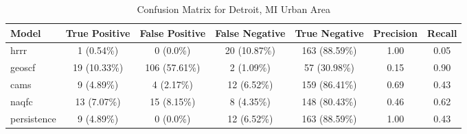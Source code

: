 \begin{table}[h!]
\centering
\begin{tabular}{lcccccc}
\hline
Model & True Positive & False Positive & False Negative & True Negative & Precision & Recall\\ \hline
hrrr & 1 (0.54\%) & 0 (0.0\%) & 20 (10.87\%) & 163 (88.59\%) & \cellcolor{green!25}1.00 & \cellcolor{red!25}0.05 \\ 
geoscf & 19 (10.33\%) & 106 (57.61\%) & 2 (1.09\%) & 57 (30.98\%) & \cellcolor{red!25}0.15 & \cellcolor{green!25}0.90 \\ 
cams & 9 (4.89\%) & 4 (2.17\%) & 12 (6.52\%) & 159 (86.41\%) & \cellcolor{red!25}0.69 & \cellcolor{green!25}0.43 \\ 
naqfc & 13 (7.07\%) & 15 (8.15\%) & 8 (4.35\%) & 148 (80.43\%) & \cellcolor{red!25}0.46 & \cellcolor{green!25}0.62 \\ 
persistence & 9 (4.89\%) & 0 (0.0\%) & 12 (6.52\%) & 163 (88.59\%) & 1.00 & 0.43 \\ 
\hline
\end{tabular}
\caption{Confusion Matrix for Detroit, MI Urban Area}
\end{table}
